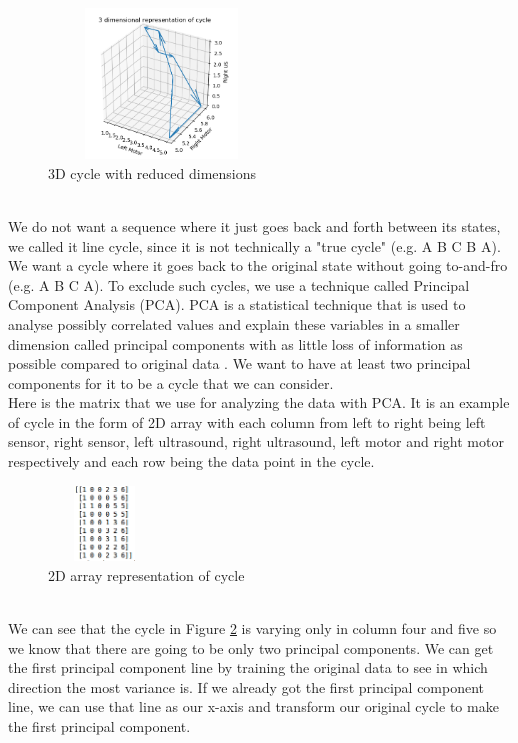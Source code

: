 \documentclass[a4paper]{article}
\begin{document}
\begin{figure}[ht!]
	\centering
	\includegraphics[width=60mm,height=40mm]{3d.png}
	\caption{3D cycle with reduced dimensions} 
	\label{3d}
\end{figure}
\\
We do not want a sequence where it just goes back and forth between its states, we called it line cycle, since it is not technically a "true cycle" (e.g. A B C B A). We want a cycle where it goes back to the original state without going to-and-fro (e.g. A B C A). To exclude such cycles, we use a technique called Principal Component Analysis (PCA). PCA is a statistical technique that is used to analyse possibly correlated values and explain these variables in a smaller dimension called principal components with as little loss of information as possible compared to original data \cite{pca}. We want to have at least two principal components for it to be a cycle that we can consider. 
\\\newline
Here is the matrix that we use for analyzing the data with PCA. It is an example of cycle in the form of 2D array with each column from left to right being left sensor, right sensor, left ultrasound, right ultrasound, left motor and right motor respectively and each row being the data point in the cycle.
\begin{figure}[ht!]
	\centering
	\includegraphics[width=30mm,height=20mm]{dimensions.png}
	\caption{2D array representation of cycle} \label{dimensions}
\end{figure}
\\\newline
We can see that the cycle in Figure \ref{dimensions} is varying only in column four and five so we know that there are going to be only two principal components. We can get the first principal component line by training the original data to see in which direction the most variance is. If we already got the first principal component line, we can use that line as our x-axis and transform our original cycle to make the first principal component.  
\end{document}
